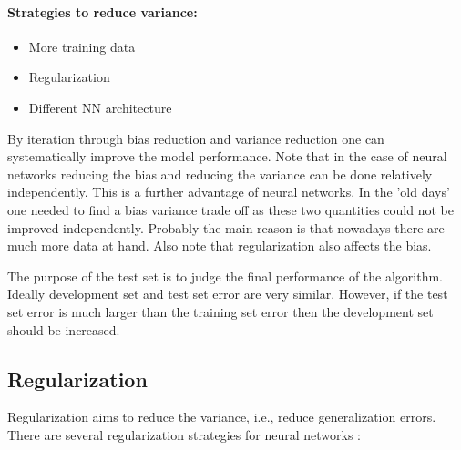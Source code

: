 \documentclass[12pt,a4paper]{article}
\begin{document}
\paragraph{Strategies to reduce variance:}
\begin{itemize}
	\setlength\itemsep{0em}
	\item More training data
	\item Regularization
	\item Different NN architecture
\end{itemize}
By iteration through bias reduction and variance reduction one can systematically improve the model performance. Note that in the case of neural networks reducing the bias and reducing the variance can be done relatively independently. This is a further advantage of neural networks. In the 'old days' one needed to find a bias variance trade off as these two quantities could not be improved independently. Probably the main reason is that nowadays there are much more data at hand. Also note that regularization also affects the bias.

The purpose of the test set is to judge the final performance of the algorithm. Ideally development set and test set error are very similar. However, if the test set error is much larger than the training set error then the development set should be increased.

\subsection{Regularization}
Regularization aims to reduce the variance, i.e., reduce generalization errors. There are several regularization strategies for neural networks \cite{Srihari:regularization_talk, Goodfellow:2016:DL}:	
\end{document}
